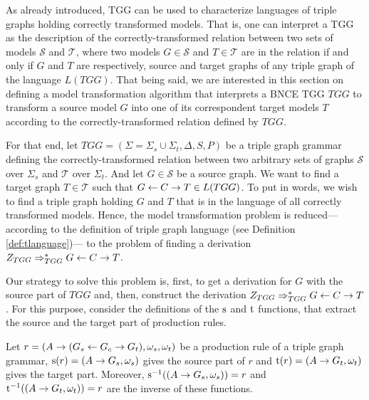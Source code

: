 As already introduced, TGG can be used to characterize languages of triple graphs holding correctly transformed models. That is, one can interpret a TGG as the description of the correctly-transformed relation between two sets of models $\mathcal{S}$ and $\mathcal{T}$, where two models $G \in \mathcal{S}$ and $T \in \mathcal{T}$ are in the relation if and only if $G$ and $T$ are respectively, source and target graphs of any triple graph of the language $L(TGG)$. That being said, we are interested in this section on defining a model transformation algorithm that interprets a BNCE TGG $TGG$ to transform a source model $G$ into one of its correspondent target models $T$ according to the correctly-transformed relation defined by $TGG$.

For that end, let $TGG = (\Sigma = \Sigma_s \cup \Sigma_t, \Delta, S, P)$ be a triple graph grammar defining the correctly-transformed relation between two arbitrary sets of graphs $\mathcal{S}$ over $\Sigma_s$ and $\mathcal{T}$ over $\Sigma_t$. And let $G \in \mathcal{S}$ be a source graph. We want to find a target graph $T \in \mathcal{T}$ such that $G \overset{}{\leftarrow} C \overset{}{\rightarrow} T \in L(TGG)$. To put in words, we wish to find a triple graph holding $G$ and $T$ that is in the language of all correctly transformed models. Hence, the model transformation problem is reduced--- according to the definition of triple graph language (see Definition \ref{def:tlanguage})--- to the problem of finding a derivation $Z_{TGG} \Rightarrow^*_{TGG} G \overset{}{\leftarrow} C \overset{}{\rightarrow} T$.

Our strategy to solve this problem is, first, to get a derivation for $G$ with the source part of $TGG$ and, then, construct the derivation $Z_{TGG} \Rightarrow^*_{TGG} G \overset{}{\leftarrow} C \overset{}{\rightarrow} T$. For this purpose, consider the definitions of the $\operatorname{s}$ and $\operatorname{t}$ functions, that extract the source and the target part of production rules.

\begin{definition}
	\label{def:source}
	Let $r = (A \to (G_s \overset{}{\leftarrow} G_c \overset{}{\rightarrow} G_t), \omega_s, \omega_t)$ be a production rule of a triple graph grammar, $\operatorname{s}(r) = (A \to G_s,\omega_s)$ gives the source part of $r$ and $\operatorname{t}(r) = (A \to G_t,\omega_t)$ gives the target part. Moreover, $\operatorname{s}^{-1}((A \to G_s,\omega_s)) = r$ and $\operatorname{t}^{-1}((A \to G_t,\omega_t)) = r$ are the inverse of these functions.
\end{definition}


